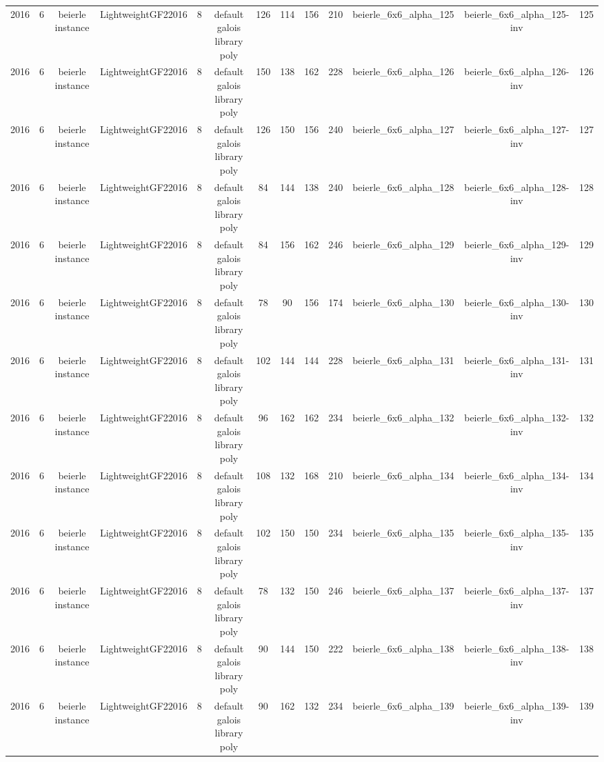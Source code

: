 \begin{tabular}{c c c c c c c c c c c c c}
2016 & 6 & beierle instance & LightweightGF22016 & 8 & default galois library poly & 126 & 114 & 156 & 210 & beierle_6x6_alpha_125 & beierle_6x6_alpha_125-inv & 125 \\
2016 & 6 & beierle instance & LightweightGF22016 & 8 & default galois library poly & 150 & 138 & 162 & 228 & beierle_6x6_alpha_126 & beierle_6x6_alpha_126-inv & 126 \\
2016 & 6 & beierle instance & LightweightGF22016 & 8 & default galois library poly & 126 & 150 & 156 & 240 & beierle_6x6_alpha_127 & beierle_6x6_alpha_127-inv & 127 \\
2016 & 6 & beierle instance & LightweightGF22016 & 8 & default galois library poly & 84 & 144 & 138 & 240 & beierle_6x6_alpha_128 & beierle_6x6_alpha_128-inv & 128 \\
2016 & 6 & beierle instance & LightweightGF22016 & 8 & default galois library poly & 84 & 156 & 162 & 246 & beierle_6x6_alpha_129 & beierle_6x6_alpha_129-inv & 129 \\
2016 & 6 & beierle instance & LightweightGF22016 & 8 & default galois library poly & 78 & 90 & 156 & 174 & beierle_6x6_alpha_130 & beierle_6x6_alpha_130-inv & 130 \\
2016 & 6 & beierle instance & LightweightGF22016 & 8 & default galois library poly & 102 & 144 & 144 & 228 & beierle_6x6_alpha_131 & beierle_6x6_alpha_131-inv & 131 \\
2016 & 6 & beierle instance & LightweightGF22016 & 8 & default galois library poly & 96 & 162 & 162 & 234 & beierle_6x6_alpha_132 & beierle_6x6_alpha_132-inv & 132 \\
2016 & 6 & beierle instance & LightweightGF22016 & 8 & default galois library poly & 108 & 132 & 168 & 210 & beierle_6x6_alpha_134 & beierle_6x6_alpha_134-inv & 134 \\
2016 & 6 & beierle instance & LightweightGF22016 & 8 & default galois library poly & 102 & 150 & 150 & 234 & beierle_6x6_alpha_135 & beierle_6x6_alpha_135-inv & 135 \\
2016 & 6 & beierle instance & LightweightGF22016 & 8 & default galois library poly & 78 & 132 & 150 & 246 & beierle_6x6_alpha_137 & beierle_6x6_alpha_137-inv & 137 \\
2016 & 6 & beierle instance & LightweightGF22016 & 8 & default galois library poly & 90 & 144 & 150 & 222 & beierle_6x6_alpha_138 & beierle_6x6_alpha_138-inv & 138 \\
2016 & 6 & beierle instance & LightweightGF22016 & 8 & default galois library poly & 90 & 162 & 132 & 234 & beierle_6x6_alpha_139 & beierle_6x6_alpha_139-inv & 139 \\

\end{tabular}
